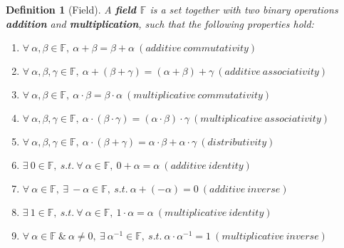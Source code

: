 \documentclass{article}
\newtheorem{definition}{Definition}[section] %
\begin{document}
\begin{definition}[Field]
    A \textbf{field $\mathbb{F}$} is a set together with two binary operations \textbf{addition} and \textbf{multiplication}, such that the following properties hold:
    \begin{enumerate}[label=(\arabic*)]
        \item $\forall \ \alpha, \beta \in \mathbb{F}, \ \alpha+\beta=\beta+\alpha \ (additive \ commutativity)$
        \item $\forall \ \alpha, \beta, \gamma \in \mathbb{F}, \ \alpha+(\beta+\gamma)=(\alpha+\beta)+\gamma \ (additive \ associativity)$
        \item $\forall \ \alpha, \beta \in \mathbb{F}, \ \alpha \cdot \beta = \beta \cdot \alpha \ (multiplicative \ commutativity)$
        \item $\forall \ \alpha, \beta, \gamma \in \mathbb{F}, \ \alpha \cdot (\beta \cdot \gamma)=(\alpha \cdot \beta) \cdot \gamma \ (multiplicative \ associativity)$
        \item $\forall \ \alpha, \beta, \gamma \in \mathbb{F}, \ \alpha \cdot (\beta + \gamma)=\alpha \cdot \beta + \alpha \cdot \gamma \ (distributivity)$
        \item $\exists \ 0 \in \mathbb{F}, \ s.t. \ \forall \ \alpha \in \mathbb{F}, \ 0 + \alpha = \alpha \ (additive \ identity)$
        \item $\forall \ \alpha \in \mathbb{F}, \ \exists \ -\alpha \in \mathbb{F}, \ s.t. \ \alpha + (-\alpha) = 0 \ (additive \ inverse)$
        \item $\exists \ 1 \in \mathbb{F}, \ s.t. \ \forall \ \alpha \in \mathbb{F}, \ 1 \cdot \alpha = \alpha \ (multiplicative \ identity)$
        \item $\forall \ \alpha \in \mathbb{F} \ \& \ \alpha \neq 0, \ \exists \ {\alpha}^{-1} \in \mathbb{F}, \ s.t. \ \alpha \cdot {\alpha}^{-1} = 1 \ (multiplicative \ inverse)$
    \end{enumerate}
\end{definition}
\end{document}
